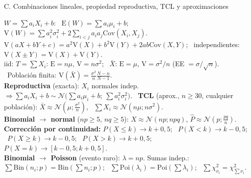 \documentclass[10pt,a4paper]{extarticle}
\newcommand{\E}{\mathrm{E}}
\newcommand{\V}{\mathrm{V}}
\newcommand{\Cov}{\mathrm{Cov}}
\newcommand{\Nor}{\mathcal{N}}
\newcommand{\Xb}{\bar{X}}
\newcommand{\chis}{\chi^2}
\newcommand{\sq}[1]{\sqrt{#1}}
\begin{document}
\begin{hoja}{C. Combinaciones lineales, propiedad reproductiva, TCL y aproximaciones}
\raggedright
$W=\sum a_iX_i+b$: \ $\E(W)=\sum a_i\mu_i+b$; \ $\V(W)=\sum a_i^2\sigma_i^2+2\sum_{i<j}a_ia_j\Cov(X_i,X_j)$. \quad
$\V(aX+bY+c)=a^2\V(X)+b^2\V(Y)+2ab\Cov(X,Y)$; \ independientes: $\V(X\pm Y)=\V(X)+\V(Y)$.\\
iid: $T=\sum X_i$: $\E=n\mu$, $\V=n\sigma^2$; \ $\Xb$: $\E=\mu$, $\V=\sigma^2/n$ (EE $=\sigma/\sq n$). \ Población finita: $\V(\Xb)=\frac{\sigma^2}n\frac{N-n}{N-1}$.\\
\textbf{Reproductiva} (exacta): $X_i$ normales indep.\ $\Rightarrow\sum a_iX_i+b\sim\Nor\big(\sum a_i\mu_i+b;\ \sum a_i^2\sigma_i^2\big)$. \
\textbf{TCL} (aprox., $n\ge30$, cualquier población): $\Xb\approx\Nor(\mu;\frac{\sigma^2}n)$, \ $\sum X_i\approx\Nor(n\mu;n\sigma^2)$.\\
\textbf{Binomial $\to$ normal} ($np\ge5$, $nq\ge5$): $X\approx\Nor(np;npq)$, $\hat P\approx\Nor(p;\frac{pq}n)$. \textbf{Corrección por continuidad:} $P(X\le k)\to k{+}0{,}5$; \ $P(X<k)\to k{-}0{,}5$; \ $P(X\ge k)\to k{-}0{,}5$; \ $P(X>k)\to k{+}0{,}5$; \ $P(X=k)\to[k{-}0{,}5;k{+}0{,}5]$.\\
\textbf{Binomial $\to$ Poisson} (evento raro): $\lambda=np$. \quad Sumas indep.: $\sum\mathrm{Bin}(n_i;p)=\mathrm{Bin}(\sum n_i;p)$; \ $\sum\mathrm{Poi}(\lambda_i)=\mathrm{Poi}(\sum\lambda_i)$; \ $\sum\chis_{\nu_i}=\chis_{\sum\nu_i}$.
\end{hoja}
\end{document}
